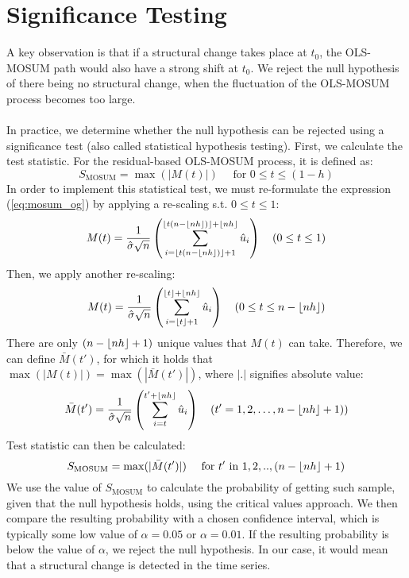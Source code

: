 \documentclass[main.tex]{subfiles}
\begin{document}
\section{Significance Testing}
\label{sec:significance_testing}
A key observation is that if a structural change takes place at $t_0$, the
OLS-MOSUM path would also have a strong shift at $t_0$.
We reject the null hypothesis of there being no structural change, when the fluctuation of
the OLS-MOSUM process becomes too large.\\\\
In practice, we determine whether the null
hypothesis can be rejected using a significance test (also called statistical
hypothesis testing).
First, we calculate the test statistic. For the residual-based OLS-MOSUM
process, it is defined as:
\begin{equation} \label{eq:test_statistic_og}
  S_{\text{MOSUM}} = \max(|M(t)|) \quad \text{ for } 0 \leq t \leq (1-h)
\end{equation}
In order to implement this statistical test, we must re-formulate 
the expression (\ref{eq:mosum_og}) by applying a re-scaling s.t. $0 \leq t \leq 1$:
\begin{equation}
  M(t) =
  \frac{1}{\hat{\sigma} \sqrt{n}}
  \left(\sum_{i=\lfloor t(n - \lfloor nh\rfloor)\rfloor + 1}^{\lfloor t(n - \lfloor nh\rfloor)\rfloor + \lfloor nh\rfloor} \hat{u}_i\right)
  \quad(0 \leq t \leq 1)
\end{equation}
Then, we apply another re-scaling:
\begin{equation}
  M(t) =
  \frac{1}{\hat{\sigma} \sqrt{n}}
  \left(\sum_{i=\lfloor t\rfloor + 1}^{\lfloor t\rfloor + \lfloor nh\rfloor} \hat{u}_i\right)
  \quad(0 \leq t \leq n - \lfloor nh\rfloor)
\end{equation}
There are only $(n - \lfloor nh\rfloor + 1)$ unique values that $M(t)$ can take.
Therefore, we can define $\bar{M}(t')$, for which it holds that
$\max(|M(t)|) = \max(|\bar{M}(t')|)$, where $| . |$ signifies absolute value:
\begin{equation} \label{eq:mosum}
  \bar{M}(t') =
  \frac{1}{\hat{\sigma} \sqrt{n}}
  \left(\sum_{i=t}^{t' + \lfloor nh\rfloor} \hat{u}_i\right)
  \quad(t' = 1,2, \hdots, n - \lfloor nh\rfloor + 1))
\end{equation}
Test statistic can then be calculated:
\begin{equation} \label{eq:test_statistic}
  S_{\text{MOSUM}} = \max(|\bar{M}(t')|) \quad \text{ for } t' \text{ in } 1,2,..,(n - \lfloor nh\rfloor + 1)
\end{equation}
We use the value of $S_{\text{MOSUM}}$ to calculate the probability of getting such
sample, given that the null hypothesis holds, using the critical values approach.
We then compare the resulting
probability with a chosen confidence interval, which is typically some low value
of $\alpha = 0.05$ or $\alpha = 0.01$. If the resulting probability is below the
value of $\alpha$, we reject the null hypothesis. 
In our case, it would mean that a
structural change is detected in the time series. 
\end{document}
